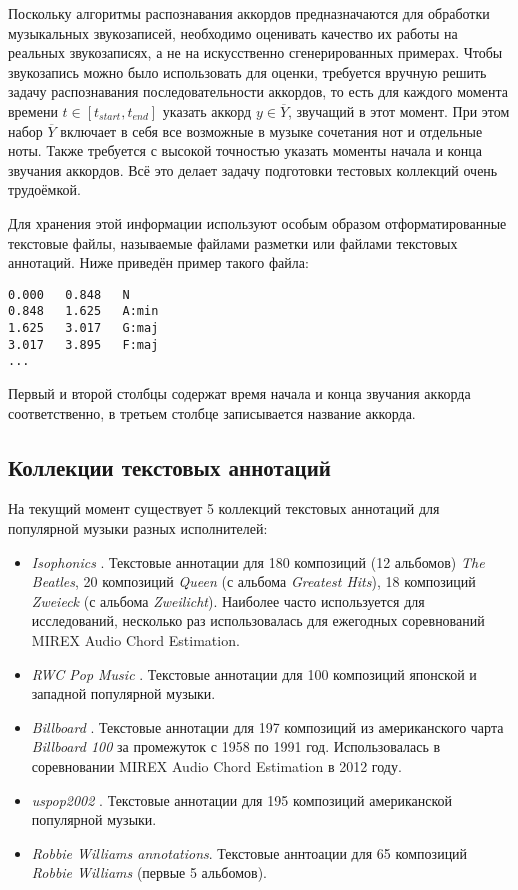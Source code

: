 Поскольку алгоритмы распознавания аккордов предназначаются для обработки
музыкальных звукозаписей, необходимо оценивать качество их работы на реальных
звукозаписях, а не на искусственно сгенерированных примерах. Чтобы звукозапись
можно было использовать для оценки, требуется вручную решить задачу
распознавания последовательности аккордов, то есть для каждого момента времени
$t \in [t_{start}, t_{end}]$ указать аккорд $y \in \overline{Y}$, звучащий в
этот момент. При этом набор $\overline{Y}$ включает в себя все возможные в
музыке сочетания нот и отдельные ноты. Также требуется с высокой точностью
указать моменты начала и конца звучания аккордов. Всё это делает задачу
подготовки тестовых коллекций очень трудоёмкой.

Для хранения этой информации используют особым образом отформатированные
текстовые файлы, называемые файлами разметки или файлами текстовых аннотаций.
Ниже приведён пример такого файла:
\begin{lstlisting}
0.000	0.848	N
0.848	1.625	A:min
1.625	3.017	G:maj
3.017	3.895	F:maj
...
\end{lstlisting}
Первый и второй столбцы содержат время начала и конца звучания аккорда
соответственно, в третьем столбце записывается название аккорда. 

\subsection{Коллекции текстовых аннотаций} \label{ssectT_coll}

На текущий момент существует 5 коллекций текстовых аннотаций для популярной
музыки разных исполнителей:
\begin{itemize}
  \item \emph{Isophonics} \cite{MauchOmp2009}. Текстовые аннотации для 180
  композиций (12 альбомов) \textit{The Beatles}, 20 композиций \textit{Queen}
  (с альбома \textit{Greatest Hits}), 18 композиций \textit{Zweieck} (с альбома
  \textit{Zweilicht}). Наиболее часто используется для исследований, несколько
  раз использовалась для ежегодных соревнований MIREX Audio Chord Estimation.
  
  \item \emph{RWC Pop Music} \cite{Goto2002}. Текстовые аннотации для 100
  композиций японской и западной популярной музыки.
  
  \item \emph{Billboard} \cite{Burgoyne2011}. Текстовые аннотации для 197
  композиций из американского чарта \textit{Billboard 100} за промежуток с 1958
  по 1991 год. Использовалась в соревновании MIREX Audio Chord Estimation в 2012
  году.
  
  \item \emph{uspop2002} \cite{Berenzweig2004}. Текстовые аннотации для 195
  композиций американской популярной музыки.
  
  \item \emph{Robbie Williams annotations}. Текстовые аннтоации для 65
  композиций \textit{Robbie Williams} (первые 5 альбомов).
\end{itemize}

